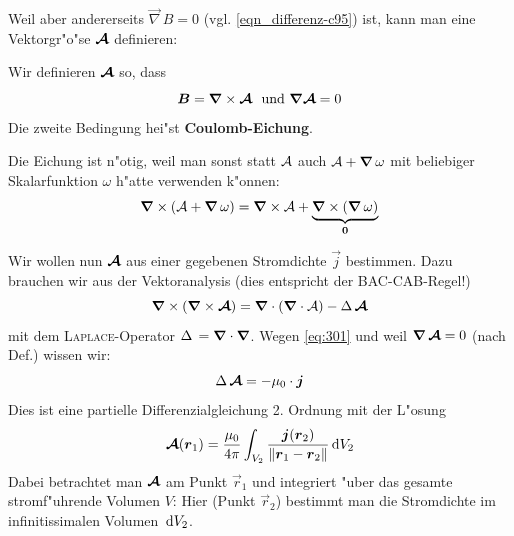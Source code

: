 Weil aber andererseits $\vec \nabla \, B = 0$ (vgl. \eqref{eqn_differenz-c95})
ist, kann man eine Vektorgr"o"se $\boldsymbol{\mathcal{A}}$ definieren:
\begin{Def}
   Wir definieren $\boldsymbol{\mathcal{A}}$ so, dass
   \begin{equation}
      \label{eq:303}
      \boldsymbol{B} = \boldsymbol{\nabla} \times \boldsymbol{\mathcal{A}} ~ \text{ und } \boldsymbol{\nabla} \boldsymbol{\mathcal{A}} = 0
   \end{equation}
Die zweite Bedingung hei"st \textbf{Coulomb-Eichung}.
\end{Def}
Die Eichung ist n"otig, weil man sonst statt $\mathcal{A}$ auch $\mathcal{A} + \boldsymbol{\nabla} \, \omega$ mit beliebiger Skalarfunktion $\omega$ h"atte
verwenden k"onnen:
\begin{equation*}
   \boldsymbol{\nabla} \times \left ( \mathcal{A} + \boldsymbol{\nabla} \, \omega \right )
=
   \boldsymbol{\nabla} \times \mathcal{A}  +    \underbrace{\boldsymbol{\nabla} \times \left ( \boldsymbol{\nabla} \, \omega \right)}_{\boldsymbol{0}}
\end{equation*}


\bigskip

Wir wollen nun $\boldsymbol{\mathcal{A}}$ aus einer gegebenen Stromdichte $\vec j$
bestimmen. Dazu brauchen wir aus der Vektoranalysis (dies entspricht
der BAC-CAB-Regel!)
\begin{equation}
   \label{eqn_differenz-c98}
   \boldsymbol{\nabla} \times \left ( \boldsymbol{\nabla} \times \boldsymbol{\mathcal{A}} \right )=
\boldsymbol{\nabla} \cdot ( \boldsymbol{\nabla} \cdot \mathcal{A} ) -  \Delta \, \boldsymbol{\mathcal{A}}
\end{equation}
mit dem \textsc{Laplace}-Operator $\Delta \, = \boldsymbol{\nabla} \cdot \boldsymbol{\nabla}$. Wegen \eqref{eq:301}
und weil $\boldsymbol{\nabla} \, \boldsymbol{\mathcal{A}} = 0$ (nach Def.) wissen wir:
\begin{equation}
   \label{eq:309}
   \Delta \, \boldsymbol{\mathcal{A}} = - \mu_0 \cdot \boldsymbol{j}
\end{equation}
Dies ist eine partielle Differenzialgleichung 2. Ordnung mit der
L"osung
\begin{equation}
   \label{eq:310}
   \boldsymbol{\mathcal{A}}(\boldsymbol{r}_1) = \frac{\mu_0}{4\pi} \int_{V_2} \frac{\boldsymbol{j}(\boldsymbol{r}_2)}{\|\boldsymbol{r}_1 - \boldsymbol{r}_2\|} \, \mathrm{d} V_2
\end{equation}
Dabei betrachtet man $\boldsymbol{\mathcal{A}}$ am Punkt $\vec r_1$ und integriert
"uber das gesamte stromf"uhrende Volumen $V$: Hier (Punkt $\vec r_2$)
bestimmt man die Stromdichte im infinitissimalen Volumen $\, \mathrm{d} V_2$.

